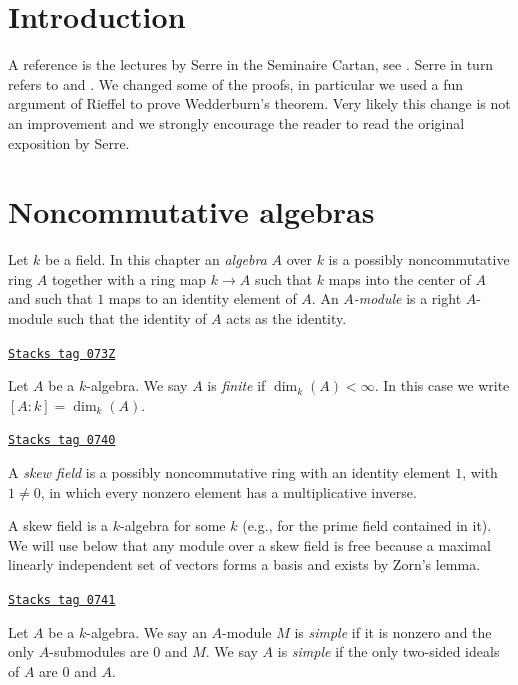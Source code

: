 \section{Introduction}
\label{brauer-section-introduction}
A reference is the lectures by Serre in the Seminaire Cartan, see
\cite{Serre-Cartan}. Serre in turn refers to
\cite{Deuring} and \cite{ANT}. We changed some of the proofs, in particular
we used a fun argument of Rieffel to prove Wedderburn's theorem.
Very likely this change is not an improvement and we strongly
encourage the reader to read the original exposition by Serre.

\section{Noncommutative algebras}
\label{brauer-section-algebras}
Let $k$ be a field. In this chapter an {\it algebra} $A$ over $k$ is
a possibly noncommutative ring $A$ together with a ring map
$k \to A$ such that $k$ maps into the center of $A$ and such that
$1$ maps to an identity element of $A$. An {\it $A$-module} is a right
$A$-module such that the identity of $A$ acts as the identity.

\begin{definition}[Finite]
\label{brauer-definition-finite}
\href{https://stacks.math.columbia.edu/tag/073Z}{\texttt{Stacks tag 073Z}}

Let $A$ be a $k$-algebra. We say $A$ is {\it finite} if $\dim_k(A) < \infty$.
In this case we write $[A : k] = \dim_k(A)$.
\end{definition}

\begin{definition}
\label{brauer-definition-skew-field}
\href{https://stacks.math.columbia.edu/tag/0740}{\texttt{Stacks tag 0740}}

A {\it skew field} is a possibly noncommutative ring with an identity
element $1$, with $1 \not = 0$, in which every nonzero element
has a multiplicative inverse.
\end{definition}

A skew field is a $k$-algebra for some $k$ (e.g., for the prime field
contained in it). We will use below that any module over a skew field
is free because a maximal linearly independent set of vectors forms a
basis and exists by Zorn's lemma.

\begin{definition}[Simple]
\label{brauer-definition-simple}
\href{https://stacks.math.columbia.edu/tag/0741}{\texttt{Stacks tag 0741}}

Let $A$ be a $k$-algebra.
We say an $A$-module $M$ is {\it simple} if it is nonzero and
the only $A$-submodules are $0$ and $M$.
We say $A$ is {\it simple} if the only two-sided ideals of $A$ are
$0$ and $A$.
\end{definition}

